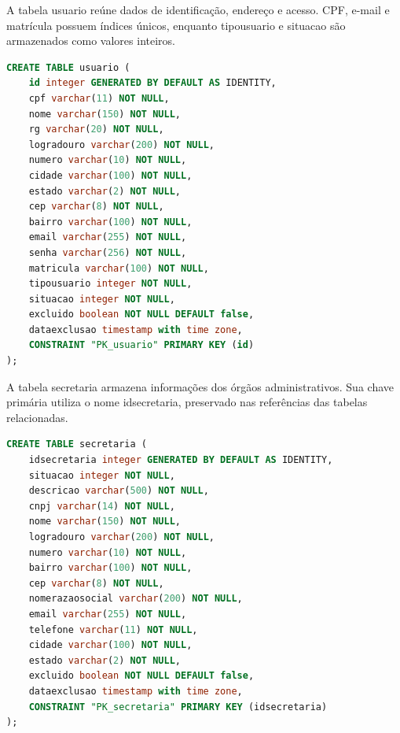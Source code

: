 A tabela usuario reúne dados de identificação, endereço e acesso. CPF, e-mail e matrícula possuem índices únicos, enquanto tipousuario e situacao são armazenados como valores inteiros.

\begin{quadro}[H]
\caption{Script de criação da tabela usuario}\label{qua:bd-usuario}
\begin{lstlisting}[language=SQL,breaklines=true,breakatwhitespace=false,frame=single,columns=fullflexible,basicstyle=\ttfamily\footnotesize]
CREATE TABLE usuario (
    id integer GENERATED BY DEFAULT AS IDENTITY,
    cpf varchar(11) NOT NULL,
    nome varchar(150) NOT NULL,
    rg varchar(20) NOT NULL,
    logradouro varchar(200) NOT NULL,
    numero varchar(10) NOT NULL,
    cidade varchar(100) NOT NULL,
    estado varchar(2) NOT NULL,
    cep varchar(8) NOT NULL,
    bairro varchar(100) NOT NULL,
    email varchar(255) NOT NULL,
    senha varchar(256) NOT NULL,
    matricula varchar(100) NOT NULL,
    tipousuario integer NOT NULL,
    situacao integer NOT NULL,
    excluido boolean NOT NULL DEFAULT false,
    dataexclusao timestamp with time zone,
    CONSTRAINT "PK_usuario" PRIMARY KEY (id)
);
\end{lstlisting}
\end{quadro}

A tabela secretaria armazena informações dos órgãos administrativos. Sua chave primária utiliza o nome idsecretaria, preservado nas referências das tabelas relacionadas.

\begin{quadro}[H]
\caption{Script de criação da tabela secretaria}\label{qua:bd-secretaria}
\begin{lstlisting}[language=SQL,breaklines=true,breakatwhitespace=false,frame=single,columns=fullflexible,basicstyle=\ttfamily\footnotesize]
CREATE TABLE secretaria (
    idsecretaria integer GENERATED BY DEFAULT AS IDENTITY,
    situacao integer NOT NULL,
    descricao varchar(500) NOT NULL,
    cnpj varchar(14) NOT NULL,
    nome varchar(150) NOT NULL,
    logradouro varchar(200) NOT NULL,
    numero varchar(10) NOT NULL,
    bairro varchar(100) NOT NULL,
    cep varchar(8) NOT NULL,
    nomerazaosocial varchar(200) NOT NULL,
    email varchar(255) NOT NULL,
    telefone varchar(11) NOT NULL,
    cidade varchar(100) NOT NULL,
    estado varchar(2) NOT NULL,
    excluido boolean NOT NULL DEFAULT false,
    dataexclusao timestamp with time zone,
    CONSTRAINT "PK_secretaria" PRIMARY KEY (idsecretaria)
);
\end{lstlisting}
\end{quadro}

